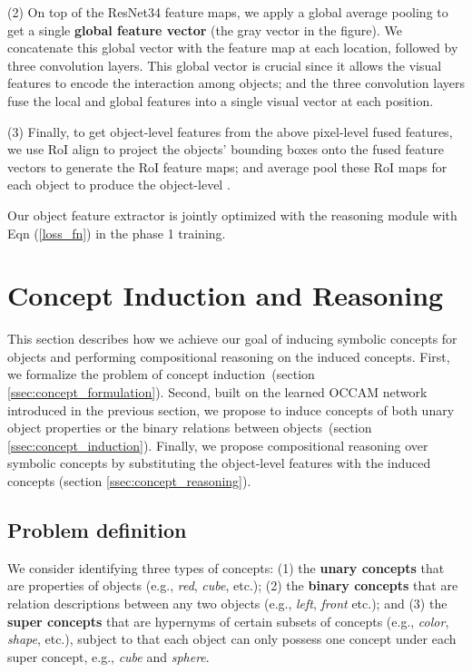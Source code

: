 \documentclass[10pt,twocolumn,letterpaper]{article}
\begin{document}
(2) On top of the ResNet34 feature maps, we apply a global average pooling to get a single \textbf{global feature vector} (the gray vector in the figure). We concatenate this global vector with the feature map at each location, followed by {three convolution layers}.
This global vector is crucial since it allows the visual features to encode the interaction among objects; and the three convolution layers {fuse} the local and global features into a single visual vector at each position.

(3) Finally, to get object-level features from the above pixel-level fused features, we use RoI align \cite{he2017mask} to project the objects' bounding boxes onto the fused feature vectors to generate the RoI feature maps; and average pool these RoI maps for each object to produce the object-level .

Our object feature extractor is jointly optimized with the reasoning module with Eqn (\ref{loss_fn}) in the phase 1 training.

\vspace{-3mm}
\section{Concept Induction and Reasoning}
\vspace{-2mm}
\label{sec:concept_induction}

This section describes how we achieve our goal of inducing symbolic concepts for objects and performing compositional reasoning on the induced concepts. 
First, we formalize the problem of concept induction~(section \ref{ssec:concept_formulation}).
Second, built on the learned OCCAM network introduced in the previous section, we propose to induce concepts of both unary object properties or the binary relations between objects~(section \ref{ssec:concept_induction}). Finally, we propose compositional reasoning over symbolic concepts by substituting the object-level features with the induced concepts (section \ref{ssec:concept_reasoning}). 

\vspace{-2mm}
\subsection{Problem definition}
\vspace{-2mm}
\label{ssec:concept_formulation}
We consider identifying three types of concepts: (1) the \textbf{unary concepts}  that are properties of objects (e.g., \emph{red}, \emph{cube}, etc.); (2) the \textbf{binary concepts}  that are relation descriptions between any two objects (e.g., \emph{left}, \emph{front} etc.); and (3) the \textbf{super concepts}  that are hypernyms of certain subsets of concepts (e.g., \emph{color}, \emph{shape}, etc.), subject to that each object can only possess one concept under each super concept, e.g., \emph{cube} and \emph{sphere}.
\end{document}
